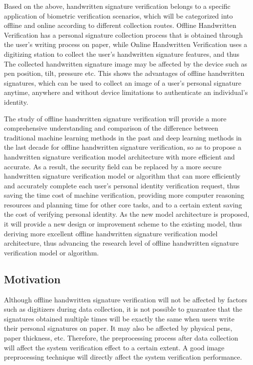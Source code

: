 \documentclass{article}
\begin{document}
Based on the above, handwritten signature verification belongs to a specific application of biometric verification scenarios, which will be categorized into offline and online according to different collection routes. Offline Handwritten Verification has a personal signature collection process that is obtained through the user's writing process on paper, while Online Handwritten Verification uses a digitizing station to collect the user's handwritten signature features, and thus The collected handwritten signature image may be affected by the device such as pen position, tilt, pressure etc. This shows the advantages of offline handwritten signatures, which can be used to collect an image of a user's personal signature anytime, anywhere and without device limitations to authenticate an individual's identity.

The study of offline handwritten signature verification will provide a more comprehensive understanding and comparison of the difference between traditional machine learning methods in the past and deep learning methods in the last decade for offline handwritten signature verification, so as to propose a handwritten signature verification model architecture with more efficient and accurate. As a result, the security field can be replaced by a more secure handwritten signature verification model or algorithm that can more efficiently and accurately complete each user's personal identity verification request, thus saving the time cost of machine verification, providing more computer reasoning resources and planning time for other core tasks, and to a certain extent saving the cost of verifying personal identity. As the new model architecture is proposed, it will provide a new design or improvement scheme to the existing model, thus deriving more excellent offline handwritten signature verification model architecture, thus advancing the research level of offline handwritten signature verification model or algorithm.

\subsection{Motivation}

Although offline handwritten signature verification will not be affected by factors such as digitizers during data collection, it is not possible to guarantee that the signatures obtained multiple times will be exactly the same when users write their personal signatures on paper. It may also be affected by physical pens, paper thickness, etc. Therefore, the preprocessing process after data collection will affect the system verification effect to a certain extent. A good image preprocessing technique will directly affect the system verification performance.
\end{document}
